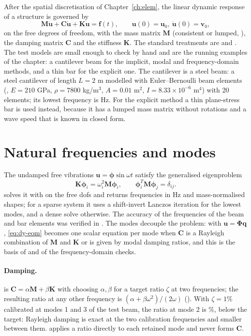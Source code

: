 After the spatial discretisation of Chapter~\ref{ch:elem}, the linear dynamic response of a structure is governed by
\begin{equation}\label{eq:dy-eom}
\bm M\ddot{\bm u}+\bm C\dot{\bm u}+\bm K\bm u=\bm f(t),\qquad \bm u(0)=\bm u_0,\ \dot{\bm u}(0)=\bm v_0,
\end{equation}
on the free degrees of freedom, with the mass matrix $\bm M$ (consistent or lumped, ), the damping matrix $\bm C$ and the stiffness $\bm K$. The standard treatments are \citet{bathe2014fep} and \citet{zienkiewicz2013fem}. The test models are small enough to check by hand and are the running examples of the chapter: a cantilever beam for the implicit, modal and frequency-domain methods, and a thin bar for the explicit one. The cantilever is a steel beam: a steel cantilever of length $L=2$ m modelled with Euler--Bernoulli beam elements (, $E=210$ GPa, $\rho=7800$ kg/m$^3$, $A=0.01$ m$^2$, $I=8.33\times10^{-6}$ m$^4$) with 20 elements; its lowest frequency is \cdyFirstFreq{} Hz. For the explicit method a thin plane-stress bar is used instead, because it has a lumped mass matrix without rotations and a wave speed that is known in closed form.

\section{Natural frequencies and modes}\label{sec:dy-modal}

The undamped free vibrations $\bm u=\bm\phi\sin\omega t$ satisfy the generalised eigenproblem
\begin{equation}\label{eq:dy-eig}
\bm K\bm\phi_i=\omega_i^{2}\bm M\bm\phi_i,\qquad \bm\phi_i^{T}\bm M\bm\phi_j=\delta_{ij}.
\end{equation}
 solves it with  on the free dofs and returns frequencies in Hz and mass-normalised shapes; for a sparse system it uses a shift-invert Lanczos iteration for the lowest modes, and a dense solve otherwise. The accuracy of the frequencies of the beam and bar elements was verified in . The modes decouple the problem: with $\bm u=\bm\Phi\bm q$, \eqref{eq:dy-eom} becomes one scalar equation per mode when $\bm C$ is a Rayleigh combination of $\bm M$ and $\bm K$ or is given by modal damping ratios, and this is the basis of  and of the frequency-domain checks.

\paragraph{Damping.}  is $\bm C=\alpha\bm M+\beta\bm K$ with  choosing $\alpha,\beta$ for a target ratio $\zeta$ at two frequencies; the resulting ratio at any other frequency is $(\alpha+\beta\omega^2)/(2\omega)$ (). With $\zeta=1\%$ calibrated at modes 1 and 3 of the test beam, the ratio at mode 2 is \cdyRayleighMid{}\%, below the target: Rayleigh damping is exact at the two calibration frequencies and smaller between them.  applies a ratio directly to each retained mode and never forms $\bm C$.

